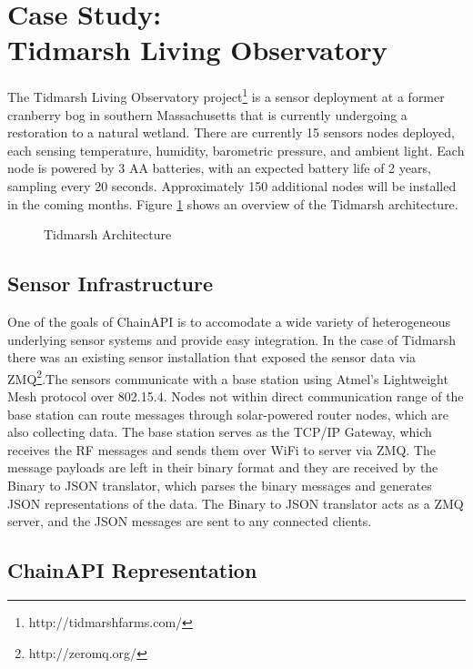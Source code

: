 \documentclass{acm_proc_article-sp}
\begin{document}
\section{Case Study:\\Tidmarsh Living Observatory}

The Tidmarsh Living Observatory project\footnote{http://tidmarshfarms.com/} is
a sensor deployment at a former cranberry bog in southern Massachusetts that is
currently undergoing a restoration to a natural wetland. There are currently 15
sensors nodes deployed, each sensing temperature, humidity, barometric
pressure, and ambient light. Each node is powered by 3 AA batteries, with an
expected battery life of 2 years, sampling every 20 seconds. Approximately 150
additional nodes will be installed in the coming months. Figure
\ref{tidmarsh_arch} shows an overview of the Tidmarsh architecture.

\begin{figure}
    \centering
    
    \caption{Tidmarsh Architecture}
    \label{tidmarsh_arch}
\end{figure}

\subsection{Sensor Infrastructure}

One of the goals of ChainAPI is to accomodate a wide variety of heterogeneous
underlying sensor systems and provide easy integration. In the case of Tidmarsh
there was an existing sensor installation that exposed the sensor data via
ZMQ\footnote{http://zeromq.org/}.The sensors communicate with a base station
using Atmel's Lightweight Mesh protocol over 802.15.4. Nodes not within direct
communication range of the base station can route messages through
solar-powered router nodes, which are also collecting data. The base station
serves as the TCP/IP Gateway, which receives the RF messages and sends them
over WiFi to server via ZMQ. The message payloads are left in their binary
format and they are received by the Binary to JSON translator, which parses the
binary messages and generates JSON representations of the data. The Binary to
JSON translator acts as a ZMQ server, and the JSON messages are sent to any
connected clients.

\subsection{ChainAPI Representation}
\end{document}
